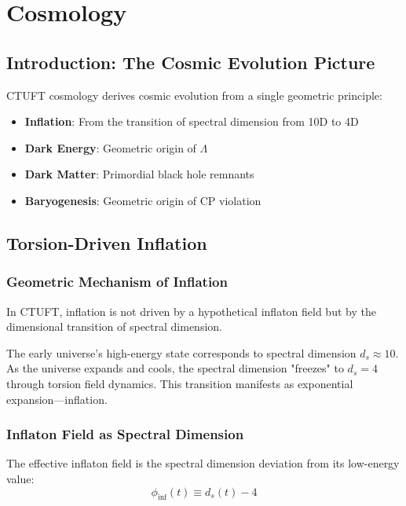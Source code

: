 \section{Cosmology}
\label{sec:cosmology}

\subsection{Introduction: The Cosmic Evolution Picture}

CTUFT cosmology derives cosmic evolution from a single geometric principle:
\begin{itemize}
    \item \textbf{Inflation}: From the transition of spectral dimension from 10D to 4D
    \item \textbf{Dark Energy}: Geometric origin of $\Lambda$
    \item \textbf{Dark Matter}: Primordial black hole remnants
    \item \textbf{Baryogenesis}: Geometric origin of CP violation
\end{itemize}

\subsection{Torsion-Driven Inflation}

\subsubsection{Geometric Mechanism of Inflation}

In CTUFT, inflation is not driven by a hypothetical inflaton field but by the dimensional transition of spectral dimension.

\begin{insight}
The early universe's high-energy state corresponds to spectral dimension $d_s \approx 10$. As the universe expands and cools, the spectral dimension "freezes" to $d_s = 4$ through torsion field dynamics. This transition manifests as exponential expansion—inflation.
\end{insight}

\subsubsection{Inflaton Field as Spectral Dimension}

The effective inflaton field is the spectral dimension deviation from its low-energy value:
\begin{equation}
    \phi_{\text{inf}}(t) \equiv d_s(t) - 4
\end{equation}

